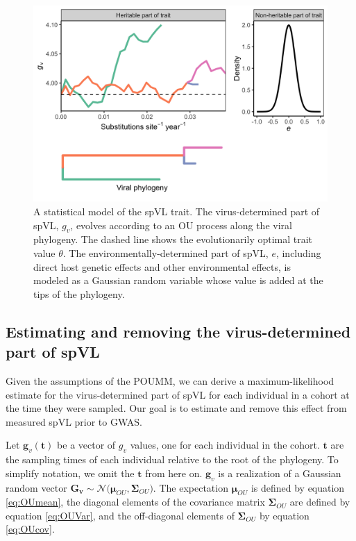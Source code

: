 \documentclass[]{article}
\begin{document}
\begin{doublespace}
\begin{figure}[H]
	\begin{center}
		\includegraphics[width=0.7\linewidth]{figures/model_figure}
		\caption{A statistical model of the spVL trait. The virus-determined part of spVL, $g_v$, evolves according to an OU process along the viral phylogeny. The dashed line shows the evolutionarily optimal trait value $\theta$. The environmentally-determined part of spVL, $e$, including direct host genetic effects and other environmental effects, is modeled as a Gaussian random variable whose value is added at the tips of the phylogeny.}
		\label{fig:spVLModel}
	\end{center}
\end{figure}

\subsection{Estimating and removing the virus-determined part of spVL}

Given the assumptions of the POUMM, we can derive a maximum-likelihood estimate for the virus-determined part of spVL for each individual in a cohort at the time they were sampled. Our goal is to estimate and remove this effect from measured spVL prior to GWAS. 

Let $\bm{g}_v(\bm{t})$ be a vector of $g_v$ values, one for each individual in the cohort. $\bm{t}$ are the sampling times of each individual relative to the root of the phylogeny. To simplify notation, we omit the $\bm{t}$ from here on. $\bm{g}_v$ is a realization of a Gaussian random vector $\bm{G_v} \sim \mathcal{N}\big(\bm{\mu}_{OU}, \boldsymbol{\Sigma}_{OU}\big)$. The expectation $\bm{\mu}_{OU}$ is defined by equation \ref{eq:OUmean}, the diagonal elements of the covariance matrix $\boldsymbol{\Sigma}_{OU}$ are defined by equation \ref{eq:OUVar}, and the off-diagonal elements of $\boldsymbol{\Sigma}_{OU}$ by equation \ref{eq:OUcov}. 


\end{doublespace}
\end{document}
